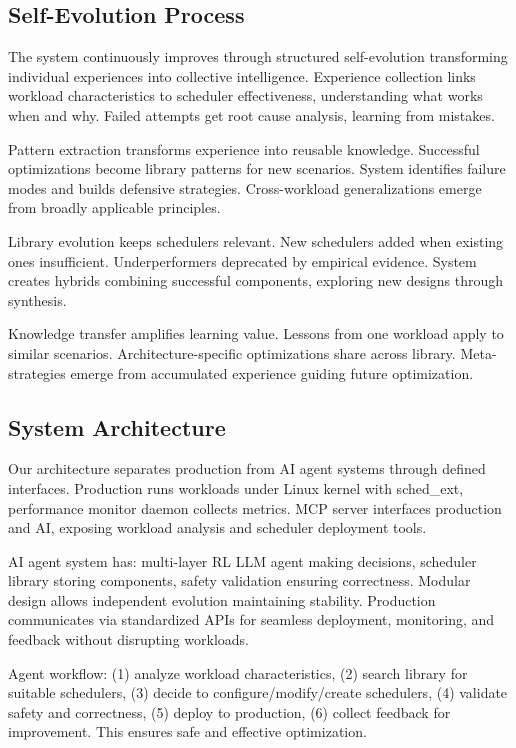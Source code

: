 \subsection{Self-Evolution Process}

The system continuously improves through structured self-evolution transforming individual experiences into collective intelligence. Experience collection links workload characteristics to scheduler effectiveness, understanding what works when and why. Failed attempts get root cause analysis, learning from mistakes.

Pattern extraction transforms experience into reusable knowledge. Successful optimizations become library patterns for new scenarios. System identifies failure modes and builds defensive strategies. Cross-workload generalizations emerge from broadly applicable principles.

Library evolution keeps schedulers relevant. New schedulers added when existing ones insufficient. Underperformers deprecated by empirical evidence. System creates hybrids combining successful components, exploring new designs through synthesis.

Knowledge transfer amplifies learning value. Lessons from one workload apply to similar scenarios. Architecture-specific optimizations share across library. Meta-strategies emerge from accumulated experience guiding future optimization.

\subsection{System Architecture}

Our architecture separates production from AI agent systems through defined interfaces. Production runs workloads under Linux kernel with sched\_ext, performance monitor daemon collects metrics. MCP server interfaces production and AI, exposing workload analysis and scheduler deployment tools.

AI agent system has: multi-layer RL LLM agent making decisions, scheduler library storing components, safety validation ensuring correctness. Modular design allows independent evolution maintaining stability. Production communicates via standardized APIs for seamless deployment, monitoring, and feedback without disrupting workloads.

Agent workflow: (1) analyze workload characteristics, (2) search library for suitable schedulers, (3) decide to configure/modify/create schedulers, (4) validate safety and correctness, (5) deploy to production, (6) collect feedback for improvement. This ensures safe and effective optimization.

